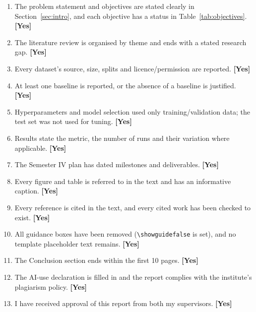 \documentclass{article}
\begin{document}
{\footnotesize
\begin{enumerate}
  \item The problem statement and objectives are stated clearly in
        Section~\ref{sec:intro}, and each objective has a status in
        Table~\ref{tab:objectives}. \textbf{[Yes]}
  \item The literature review is organised by theme and ends with a stated
        research gap. \textbf{[Yes]}
  \item Every dataset's source, size, splits and licence/permission are
        reported. \textbf{[Yes]}
  \item At least one baseline is reported, or the absence of a baseline is
        justified. \textbf{[Yes]}
  \item Hyperparameters and model selection used only training/validation data;
        the test set was not used for tuning. \textbf{[Yes]}
  \item Results state the metric, the number of runs and their variation where
        applicable. \textbf{[Yes]}
  \item The Semester IV plan has dated milestones and deliverables.
        \textbf{[Yes]}
  \item Every figure and table is referred to in the text and has an
        informative caption. \textbf{[Yes]}
  \item Every reference is cited in the text, and every cited work has been
        checked to exist. \textbf{[Yes]}
  \item All guidance boxes have been removed (\texttt{\textbackslash showguidefalse}
        is set), and no template placeholder text remains. \textbf{[Yes]}
  \item The Conclusion section ends within the first 10 pages. \textbf{[Yes]}
  \item The AI-use declaration is filled in and the report complies with the
        institute's plagiarism policy. \textbf{[Yes]}
  \item I have received approval of this report from both my supervisors.
        \textbf{[Yes]}
\end{enumerate}
}
\end{document}
